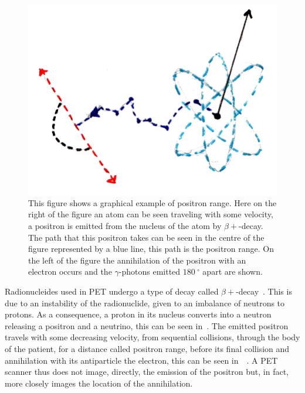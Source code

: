                 \begin{figure}
                    \centering
                    
                    \includegraphics[width=1.0\linewidth]{figures/background_positron_range.png}
                    
                    \captionsetup{singlelinecheck=false, justification=raggedright}
                    \caption{This figure shows a graphical example of positron range. Here on the right of the figure an atom can be seen traveling with some velocity, a positron is emitted from the nucleus of the atom by $\beta+$-decay. The path that this positron takes can be seen in the centre of the figure represented by a blue line, this path is the positron range. On the left of the figure the annihilation of the positron with an electron occurs and the $\gamma$-photons emitted $\SI{180}{^{\circ}}$ apart are shown.} \label{fig:decay_and_annihilation_positron_range}
                \end{figure}
                
                Radionucleides used in \gls{PET} undergo a type of decay called $\beta+$-decay~. This is due to an instability of the radionuclide, given to an imbalance of neutrons to protons. As a consequence, a proton in its nucleus converts into a neutron releasing a positron and a neutrino, this can be seen in~. The emitted positron travels with some decreasing velocity, from sequential collisions, through the body of the patient, for a distance called positron range, before its final collision and annihilation with its antiparticle the electron, this can be seen in~~. A \gls{PET} scanner thus does not image, directly, the emission of the positron but, in fact, more closely images the location of the annihilation.
                
